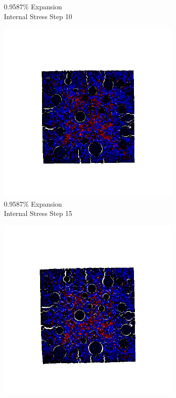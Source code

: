 \begin{figure}[ht!]
\begin{subfigure}{.25\textwidth}
      \caption{0.9587\% Expansion\\Internal Stress Step 10}
    \end{subfigure}%
    \begin{subfigure}{.25\textwidth}
      \centering
      \includegraphics[width=1.0\linewidth]{Files/exp_3D/DEF/A15X0C_4_s15.png}
      \caption{0.9587\% Expansion\\Internal Stress Step 15}
    \end{subfigure}%
    \begin{subfigure}{.25\textwidth}
      \centering   
      \includegraphics[width=1.0\linewidth]{Files/exp_3D/DEF/A15X0C_4_stress.png}

\end{subfigure}
\end{figure}
